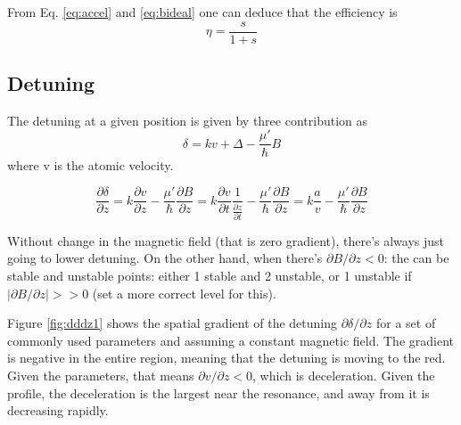 \documentclass[12pt,a4paper]{article}
\begin{document}
From Eq. \ref{eq:accel} and \ref{eq:bideal} one can deduce that the efficiency is
\begin{equation}
\eta = \frac{s}{1 + s}
\end{equation}

\subsection{Detuning}

The detuning at a given position is given by three contribution as
\begin{equation}
\delta = k v + \Delta - \frac{\mu'}{\hbar} B
\end{equation}
where v is the atomic velocity.

\begin{equation}
\frac{\partial \delta}{\partial z} = k \frac{\partial v}{\partial z} - \frac{\mu'}{\hbar}\frac{\partial B}{\partial z} = k \frac{\partial v}{\partial t} \frac{1} {\frac{\partial z}{\partial t}} - \frac{\mu'}{\hbar}\frac{\partial B}{\partial z}
= k \frac {a}{v} - \frac{\mu'}{\hbar}\frac{\partial B}{\partial z}
\label{eq:dddz}
\end{equation}

Without change in the magnetic field (that is zero gradient), there's always just going to lower detuning. On the other hand, when there's $\partial B/\partial z < 0$: the can be stable and unstable points: either 1 stable and 2 unstable, or 1 unstable if $|\partial B / \partial z| >> 0$ (set a more correct level for this).


Figure \ref{fig:dddz1} shows the spatial gradient of the detuning $\partial \delta / \partial z$ for a set of commonly used parameters and assuming a constant magnetic field. The gradient is negative in the entire region, meaning that the detuning is moving to the red. Given the parameters, that means $\partial v / \partial z < 0$, which is deceleration. Given the profile, the deceleration is the largest near the resonance, and away from it is decreasing rapidly.
\end{document}
